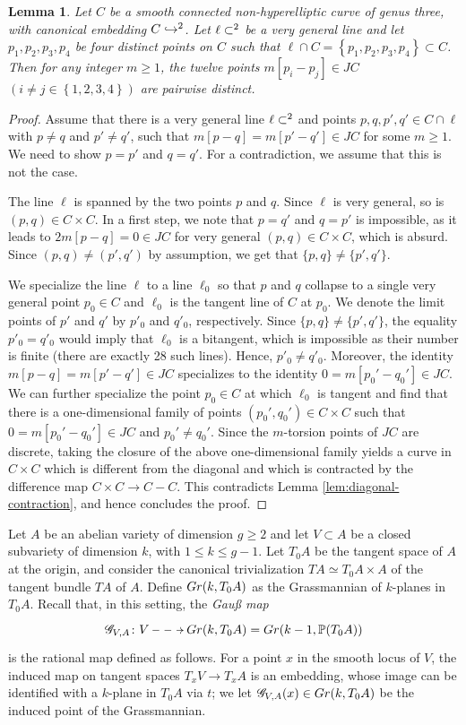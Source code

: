 \documentclass[a4paper,11pt,reqno]{amsart}
\numberwithin{equation}{section}
\theoremstyle{plain}
\newtheorem{lemma}[theorem]{Lemma}
\theoremstyle{definition}
\let\P\relax
\newcommand{\P}{\mathbb P}
\newcommand{\mr}[1]{{\mathscr{#1}}}
\let\rm\relax
\newcommand{\rm}[1]{{\mathrm{#1}}}
\renewcommand{\cong}{\simeq}
\newcommand{\set}[1]{\left\{ #1 \right\}}
\begin{document}
\begin{lemma} \label{lem:line}
Let $C$ be a smooth connected non-hyperelliptic curve of genus three, with canonical embedding $C \hookrightarrow \P^2$. 
Let $\ell \subset \P^2$ be a very general line and let $p_1, p_2, p_3, p_4$ be four distinct points on $C$ such that $\ell \cap C = \set{p_1, p_2, p_3, p_4} \subset C$. 
Then for any integer $m \geq 1$, the twelve points $m[p_i-p_j] \in JC$ $(i\neq j \in \set{1,2,3,4})$ are pairwise distinct. 
\end{lemma}
\begin{proof}
Assume that there is a very general line $\ell \subset \P^2$  and points $p,q,p',q' \in C\cap \ell$ with $p\neq q$ and $p'\neq q'$, such that $m[p-q] = m[p'-q'] \in JC$ for some  $m \geq 1$.
We need to show $p=p'$ and $q=q'$. 
For a contradiction, we assume that this is not the case.

The line $\ell$ is spanned by the two points $p$ and $q$.
Since $\ell$ is very general, so is $(p,q)\in C\times C$.
In a first step, we note that $p=q'$ and $q=p'$ is impossible, as it leads to $2m[p-q]=0\in JC$ for very general $(p,q)\in C\times C$, which is absurd.
Since $(p,q)\neq (p',q')$ by assumption, we get that $\{p,q\}\neq \{p',q'\}$.

We specialize the line $\ell$ to a line $\ell_0$ so that $p$ and $q$ collapse to a single very general point $p_0\in C$ and $\ell_0$ is the tangent line of $C$ at $p_0$. 
We denote the limit points of $p'$ and $q'$ by $p'_0$ and $q'_0$, respectively. 
Since $\{p,q\}\neq \{p',q'\}$, the equality $p'_0= q'_0$ would imply that $\ell_0$ is a bitangent, which is impossible as their number is finite (there are exactly 28 such lines).
Hence, $p'_0\neq q'_0$. 
Moreover, the identity $m[p-q] = m[p'-q'] \in JC$ specializes to the identity $0 = m [p_0' - q_0'] \in JC$. 
We can further specialize the point $p_0\in C$ at which $\ell_0$ is tangent and find that there is a one-dimensional family of points $(p_0',q_0')\in C\times C$ such that $0 = m [p_0' - q_0'] \in JC$ and $p_0' \neq q_0'$. 
Since the $m$-torsion points of $JC$ are discrete, taking the closure of the above one-dimensional family yields 
a curve in $C\times C$ which is different from the diagonal and which is contracted by the difference map $C\times C\to C-C$.
This contradicts Lemma \ref{lem:diagonal-contraction}, and hence concludes the proof. 
\end{proof}

Let $A$ be an abelian variety of dimension $g \geq 2$ and let $V \subset A$ be a closed subvariety of dimension $k$, with $1 \leq k \leq g-1$. Let $T_0A$ be the tangent space of $A$ at the origin, and consider the canonical trivialization $TA \cong T_0A \times A$ of the tangent bundle $TA$ of $A$. Define $\rm{Gr}(k,T_0A)$ as the Grassmannian of $k$-planes in $T_0A$. 
Recall that, in this setting, the \emph{Gau{\ss} map} 
\[
\xymatrix{
\mathscr G_{V,A} \colon V  \ar@{-->}[r] & \rm{Gr}(k, T_0A) = \rm{Gr}(k-1, \mathbb P(T_0A))
}
\]
is the rational map defined as follows. For a point $x$ in the smooth locus of $V$, the induced map on tangent spaces $T_xV \to T_xA$ is an embedding, whose image can be identified with a $k$-plane in $T_0A$ via $t$; 
we let $\mr G_{V,A}(x) \in \rm{Gr}(k,T_0A)$ be the induced point of the Grassmannian. 
\end{document}
